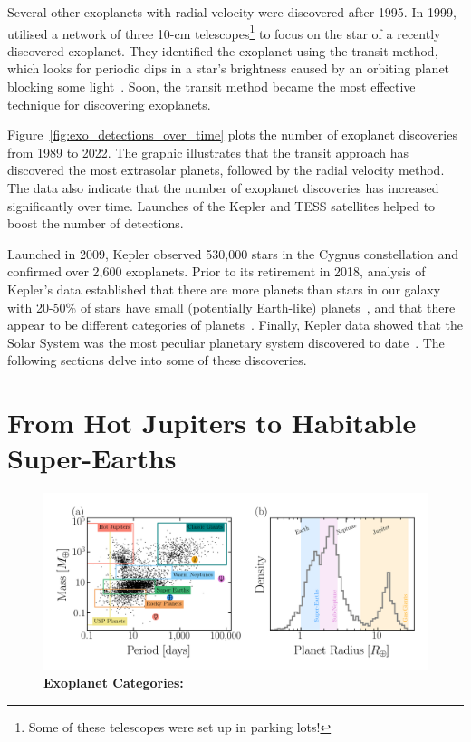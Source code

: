 Several other exoplanets with radial velocity were discovered after 1995.
In 1999, \citet{charbonneau1999detection} utilised a network of three 10-cm telescopes\footnote{Some of these telescopes were set up in parking lots!} to focus on the star of a recently discovered exoplanet.
They identified the exoplanet using the transit method, which looks for periodic dips in a star's brightness caused by an orbiting planet blocking some light~\cite{charbonneau1999detection}.
Soon, the transit method became the most effective technique for discovering exoplanets.

Figure~\ref{fig:exo_detections_over_time} plots the number of exoplanet discoveries from 1989 to 2022. 
The graphic illustrates that the transit approach has discovered the most extrasolar planets, followed by the radial velocity method.
The data also indicate that the number of exoplanet discoveries has increased significantly over time.
Launches of the Kepler and TESS satellites helped to boost the number of detections.

Launched in 2009, Kepler observed 530,000 stars in the Cygnus constellation and confirmed over 2,600 exoplanets. 
Prior to its retirement in 2018, analysis of Kepler's data established that there are more planets than stars in our galaxy~\cite{Swift_2013} with 20-50\% of stars have small (potentially Earth-like) planets~\cite{Fressin:2012:Natur, Petigura:2013:PNAS}, and that there appear to be different categories of planets~\cite{Traub:2012:ApJ, Morris:2017:ApJ, Yu:2017:ApJ}.
Finally, Kepler data showed that the Solar System was the most peculiar planetary system discovered to date~\cite{Weiss:2018:AJ}. 
The following sections delve into some of these discoveries.

\section{From Hot Jupiters to Habitable Super-Earths}


\begin{figure}
\begin{center}
  \centerline{\includegraphics[width=1.1\linewidth]{src/figures/scatter_categories.png}}
  \caption{\textbf{Exoplanet Categories:}  }
  \label{fig:exo_categories}
\end{center}
\end{figure}

